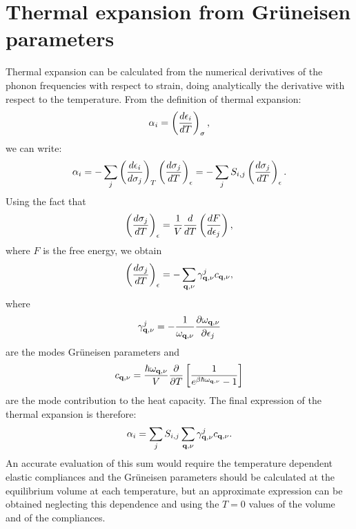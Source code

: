 \documentclass[12pt,a4paper]{article}
\begin{document}
\section{\color{coral}Thermal expansion from Gr\"uneisen parameters}
Thermal expansion can be calculated from the numerical derivatives of the 
phonon frequencies with respect to strain, doing analytically the
derivative with respect to the temperature.
From the definition of thermal expansion:
\begin{equation}
\alpha_i= \left( {d \epsilon_i \over d T}\right)_{\sigma},
\end{equation}
we can write:
\begin{equation}
\alpha_i= - \sum_j \left({d \epsilon_i \over d \sigma_j}\right)_{T} 
\left({d \sigma_j \over d T} \right)_{\epsilon} = - \sum_j S_{i,j}
\left({d \sigma_j \over d T} \right)_{\epsilon}.
\end{equation}
Using the fact that 
\begin{equation}
\left({d \sigma_j \over d T} \right)_{\epsilon} = {1\over V} {d \over d T} \left( {d F \over d \epsilon_j}\right),
\end{equation}
where $F$ is the free energy, we obtain 
\begin{equation}
\left({d \sigma_j \over d T} \right)_{\epsilon} = -\sum_{{\bf q},\nu}
\gamma_{{\bf q},\nu}^j c_{{\bf q},\nu},
\end{equation}
where
\begin{equation}
\gamma_{{\bf q},\nu}^j = -{1\over \omega_{{\bf q},\nu}} {\partial
\omega_{{\bf q},\nu} \over \partial \epsilon_j} 
\end{equation}
are the modes Gr\"uneisen parameters and 
\begin{equation}
c_{{\bf q},\nu} = {\hbar \omega_{{\bf q},\nu} \over V} {\partial
\over \partial T } \left[{1 \over e^{\beta \hbar \omega_{{\bf q},\nu}} - 1}
\right]
\end{equation}
are the mode contribution to the heat capacity.
The final expression of the thermal expansion is therefore:
\begin{equation}
\alpha_i = \sum_j S_{i,j} \sum_{{\bf q},\nu}
\gamma_{{\bf q},\nu}^j c_{{\bf q},\nu}.
\end{equation}
An accurate evaluation of this sum would require the temperature dependent
elastic compliances and the Gr\"uneisen parameters should be calculated
at the equilibrium volume at each temperature, but an approximate expression 
can be obtained neglecting this dependence and using the $T=0$ values
of the volume and of the compliances. 
\end{document}
